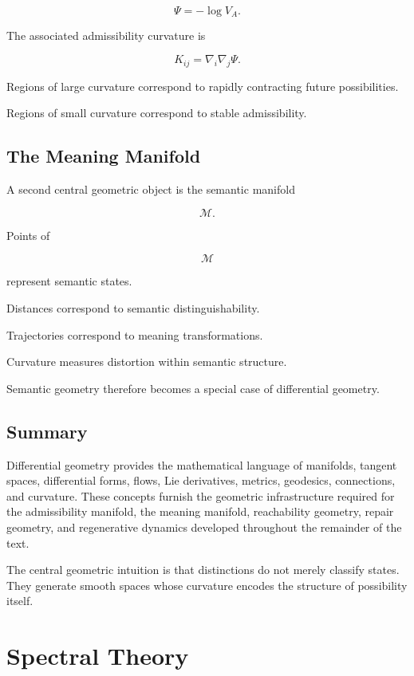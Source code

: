 \documentclass[12pt,twoside,openright]{book}
\begin{document}
\[
\Psi
=

-\log V_A.
\]

The associated admissibility curvature is

\[
K_{ij}
=

\nabla_i\nabla_j\Psi.
\]

Regions of large curvature correspond to rapidly
contracting future possibilities.

Regions of small curvature correspond to stable
admissibility.

\subsection{The Meaning Manifold}

A second central geometric object is the semantic
manifold

\[
\mathcal M.
\]

Points of

\[
\mathcal M
\]

represent semantic states.

Distances correspond to semantic distinguishability.

Trajectories correspond to meaning transformations.

Curvature measures distortion within semantic structure.

Semantic geometry therefore becomes a special case of
differential geometry.

\subsection{Summary}

Differential geometry provides the mathematical language
of manifolds, tangent spaces, differential forms, flows,
Lie derivatives, metrics, geodesics, connections, and
curvature. These concepts furnish the geometric
infrastructure required for the admissibility manifold,
the meaning manifold, reachability geometry, repair
geometry, and regenerative dynamics developed throughout
the remainder of the text.

The central geometric intuition is that distinctions do
not merely classify states. They generate smooth spaces
whose curvature encodes the structure of possibility
itself.

\section{Spectral Theory}
\end{document}

